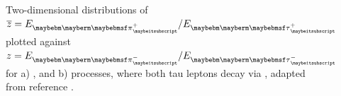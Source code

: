 \begin{figure}[htbp]
\begin{subfigure}[t]{0.45\textwidth}
    \caption{\HiggsToTauTau}
    \label{fig:theoryTauPairCorrelationH}
  \end{subfigure}
\caption[Two-dimensional distribution of \ZToTauTau and \HiggsToTauTau.]
{Two-dimensional distributions of $\overline{z} ={E_{\Ppiplus}}/{E_{\APtauon}}$ plotted against $ z ={E_{\Ppiminus}}/{E_{\Ptauon}}$  for a) \ZToTauTau, and b) \HiggsToTauTau processes, where both tau leptons decay via \tauToPionBoth, adapted from reference \cite{Tsai:1971vv}.}
\label{fig:theoryTauPairCorrelation}
\end{figure} 